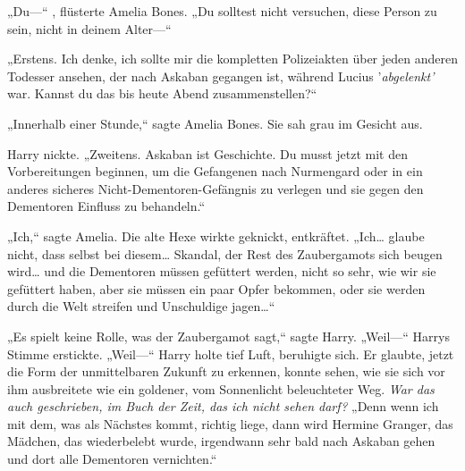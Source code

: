 „Du—“ , flüsterte Amelia Bones. „Du solltest nicht versuchen, diese Person zu sein, nicht in deinem Alter—“

„Erstens. Ich denke, ich sollte mir die kompletten Polizeiakten über jeden anderen Todesser ansehen, der nach Askaban gegangen ist, während Lucius '\emph{abgelenkt'} war. Kannst du das bis heute Abend zusammenstellen?“

„Innerhalb einer Stunde,“ sagte Amelia Bones. Sie sah grau im Gesicht aus.

Harry nickte.
„Zweitens. Askaban ist Geschichte. Du musst jetzt mit den Vorbereitungen beginnen, um die Gefangenen nach Nurmengard oder in ein anderes sicheres Nicht-Dementoren-Gefängnis zu verlegen und sie gegen den Dementoren Einfluss zu behandeln.“

„Ich,“ sagte Amelia. Die alte Hexe wirkte geknickt, entkräftet. „Ich… glaube nicht, dass selbst bei diesem… Skandal, der Rest des Zaubergamots sich beugen wird… und die Dementoren müssen gefüttert werden, nicht so sehr, wie wir sie gefüttert haben, aber sie müssen ein paar Opfer bekommen, oder sie werden durch die Welt streifen und Unschuldige jagen…“

„Es spielt keine Rolle, was der Zaubergamot sagt,“ sagte Harry. „Weil—“
Harrys Stimme erstickte.
„Weil—“
Harry holte tief Luft, beruhigte sich. Er glaubte, jetzt die Form der unmittelbaren Zukunft zu erkennen, konnte sehen, wie sie sich vor ihm ausbreitete wie ein goldener, vom Sonnenlicht beleuchteter Weg.
\emph{War das auch geschrieben, im Buch der Zeit, das ich nicht sehen darf?}
„Denn wenn ich mit dem, was als Nächstes kommt, richtig liege, dann wird Hermine Granger, das Mädchen, das wiederbelebt wurde, irgendwann sehr bald nach Askaban gehen und dort alle Dementoren vernichten.“

